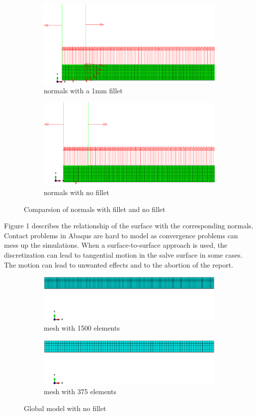 \documentclass[12pt]{article}
\begin{document}
\begin{figure}[!htb]
  \centering
  \begin{subfigure}{.5\textwidth}
    \centering
    \includegraphics[trim={0cm 1cm 20cm 3.5cm},clip,width=0.4\linewidth]{pics/normals_corner}
    \caption{normals with a 1mm fillet}
  \end{subfigure}%
  \begin{subfigure}{.5\textwidth}
    \centering
    \includegraphics[trim={0cm 1cm 20cm 4cm},clip,width=0.4\linewidth]{pics/normals_no_corner}
    \caption{normals with no fillet}
   \end{subfigure}
  \caption{Comparsion of normals with fillet and no fillet}
  \label{fig:1}
\end{figure}
Figure 1 describes the relationship of the surface with the corresponding normals. Contact problems in Abaqus are hard to model as convergence problems can mess up the simulations. When a surface-to-surface approach is used, the discretization can lead to tangential motion in the salve surface in some cases. The motion can lead to unwanted effects and to the abortion of the report.
\begin{figure}[!htb]
  \centering
  \begin{subfigure}{.5\textwidth}
    \centering
    \includegraphics[trim={0cm 7cm 20cm 7cm},clip,width=0.7\linewidth]{pics/mesh_small}
    \caption{mesh with 1500 elements}
  \end{subfigure}%
  \begin{subfigure}{.5\textwidth}
    \centering
    \includegraphics[trim={0cm 7cm 20cm 7cm},clip,width=0.7\linewidth]{pics/mesh_large}
    \caption{mesh with 375 elements}
   \end{subfigure}
  \caption{Global model with no fillet}
  \label{fig:2}
\end{figure}
\end{document}
